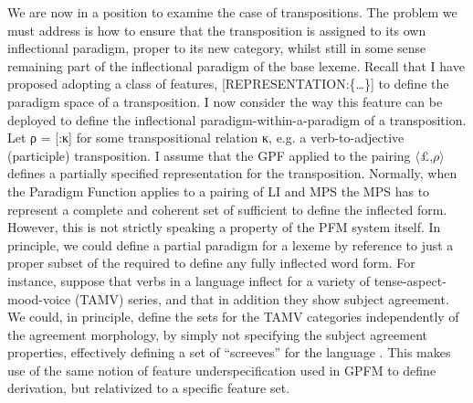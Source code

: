 \documentclass[output=paper,
modfonts
]{LSP/langsci}
\begin{document}
 We are now in a position to examine the case of transpositions. The problem we must address is how to ensure that the transposition is assigned to its own inflectional paradigm, proper to its new  category, whilst still in some sense remaining part of the inflectional paradigm of the base lexeme. %
 Recall that I have proposed adopting a class of features, [REPRESENTATION:\{\ldots\}] to define the paradigm space of a transposition.  I now consider the way this feature can be deployed to define the inflectional paradigm-within-a-paradigm of a transposition. %
Let ρ = [:κ] for some transpositional relation κ, e.g. a verb-to-adjective (participle) transposition. I assume that the GPF applied to the pairing $\langle$\pounds,$\rho$$\rangle$ defines a partially specified representation for the transposition. Normally, when the Paradigm Function applies to a pairing of LI and MPS the MPS has to represent a complete and coherent set of  sufficient to define the inflected form. However, this is not strictly speaking a property of the PFM system itself. In principle, we could define a partial paradigm for a lexeme by reference to just a proper subset of the  required to define any fully inflected word form. For instance, suppose that verbs in a language inflect for a variety of tense-aspect-mood-voice (TAMV) series, and that in addition they show subject agreement. We could, in principle, define the  sets for the TAMV categories independently of the agreement morphology, by simply not specifying the subject agreement properties, effectively defining a set of ``screeves'' for the language \parencite[as in the Georgian descriptive tradition, ][141]{AndersonSR92:book}. This makes use of the same notion of feature underspecification used in GPFM to define derivation, but relativized to a specific feature set. 
\end{document}
